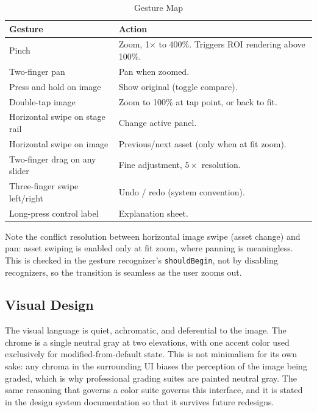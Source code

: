 \begin{table}[htbp]
\caption{Gesture Map}
\label{tab:gestures}
\begin{center}
\renewcommand{\arraystretch}{1.15}
\begin{tabularx}{\columnwidth}{@{}l>{\raggedright\arraybackslash}X@{}}
\toprule
\textbf{Gesture} & \textbf{Action} \\
\midrule
Pinch & Zoom, 1$\times$ to 400\%. Triggers ROI rendering above 100\%. \\
Two-finger pan & Pan when zoomed. \\
Press and hold on image & Show original (toggle compare). \\
Double-tap image & Zoom to 100\% at tap point, or back to fit. \\
Horizontal swipe on stage rail & Change active panel. \\
Horizontal swipe on image & Previous/next asset (only when at fit zoom). \\
Two-finger drag on any slider & Fine adjustment, $5\times$ resolution. \\
Three-finger swipe left/right & Undo / redo (system convention). \\
Long-press control label & Explanation sheet. \\
\bottomrule
\end{tabularx}
\end{center}
\end{table}

Note the conflict resolution between horizontal image swipe (asset change) and
pan: asset swiping is enabled only at fit zoom, where panning is meaningless.
This is checked in the gesture recognizer's \texttt{shouldBegin}, not by
disabling recognizers, so the transition is seamless as the user zooms out.

\subsection{Visual Design}

The visual language is quiet, achromatic, and deferential to the image. The
chrome is a single neutral gray at two elevations, with one accent color used
exclusively for modified-from-default state. This is not minimalism for its own
sake: any chroma in the surrounding UI biases the perception of the image being
graded, which is why professional grading suites are painted neutral gray. The
same reasoning that governs a color suite governs this interface, and it is
stated in the design system documentation so that it survives future
redesigns.

